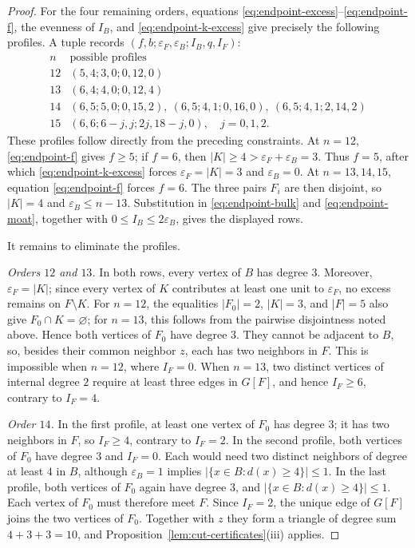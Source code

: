 \documentclass[11pt]{article}
\numberwithin{equation}{section}
\theoremstyle{definition}
\theoremstyle{remark}
\begin{document}
\begin{proof}
For the four remaining orders, equations
\eqref{eq:endpoint-excess}--\eqref{eq:endpoint-f}, the evenness of
\(I_B\), and \eqref{eq:endpoint-k-excess} give precisely the following
profiles.  A tuple records
\((f,b;\varepsilon_F,\varepsilon_B;I_B,q,I_F)\):
\[
\begin{array}{c|c}
n&\text{possible profiles}\\ \hline
12&(5,4;3,0;0,12,0)\\
13&(6,4;4,0;0,12,4)\\
14&(6,5;5,0;0,15,2),\
    (6,5;4,1;0,16,0),\
    (6,5;4,1;2,14,2)\\
15&(6,6;6-j,j;2j,18-j,0),\quad j=0,1,2.
\end{array}
\]
These profiles follow directly from the preceding constraints.  At \(n=12\),
\eqref{eq:endpoint-f} gives \(f\ge5\); if \(f=6\), then
\(|K|\ge4>\varepsilon_F+\varepsilon_B=3\).  Thus \(f=5\), after which
\eqref{eq:endpoint-k-excess} forces \(\varepsilon_F=|K|=3\) and
\(\varepsilon_B=0\).
At \(n=13,14,15\), equation \eqref{eq:endpoint-f} forces \(f=6\).
The three pairs \(F_i\) are then disjoint, so \(|K|=4\) and
\(\varepsilon_B\le n-13\).  Substitution in
\eqref{eq:endpoint-bulk} and \eqref{eq:endpoint-moat}, together with
\(0\le I_B\le2\varepsilon_B\), gives the displayed rows.

It remains to eliminate the profiles.

\smallskip
\noindent\emph{Orders \(12\) and \(13\).}
In both rows, every vertex of \(B\) has degree \(3\).  Moreover,
\(\varepsilon_F=|K|\); since every vertex of \(K\) contributes at least one
unit to \(\varepsilon_F\), no excess remains on \(F\setminus K\).  For
\(n=12\), the equalities
\(|F_0|=2\), \(|K|=3\), and \(|F|=5\) also give \(F_0\cap K=\varnothing\);
for \(n=13\), this follows from the pairwise disjointness noted above.
Hence both vertices of \(F_0\) have degree
\(3\).  They cannot be adjacent to \(B\), so, besides their common
neighbor \(z\), each has two neighbors in \(F\).  This is impossible
when \(n=12\), where \(I_F=0\).  When \(n=13\), two distinct vertices
of internal degree \(2\) require at least three edges in \(G[F]\), and
hence \(I_F\ge6\), contrary to \(I_F=4\).

\smallskip
\noindent\emph{Order \(14\).}
In the first profile, at least one vertex of \(F_0\) has degree \(3\);
it has two neighbors in \(F\), so \(I_F\ge4\), contrary to \(I_F=2\).
In the second profile, both vertices of \(F_0\) have degree \(3\) and
\(I_F=0\).  Each would need two distinct neighbors of degree at least
\(4\) in \(B\), although \(\varepsilon_B=1\) implies
\(|\{x\in B:d(x)\ge4\}|\le1\).
In the last profile, both vertices of \(F_0\) again have degree \(3\),
and \(|\{x\in B:d(x)\ge4\}|\le1\).  Each vertex
of \(F_0\) must therefore meet \(F\).  Since \(I_F=2\), the unique edge
of \(G[F]\) joins the two vertices of \(F_0\).  Together with \(z\)
they form a triangle of degree sum \(4+3+3=10\), and
  Proposition~\ref{lem:cut-certificates}(iii) applies.


\end{proof}
\end{document}
